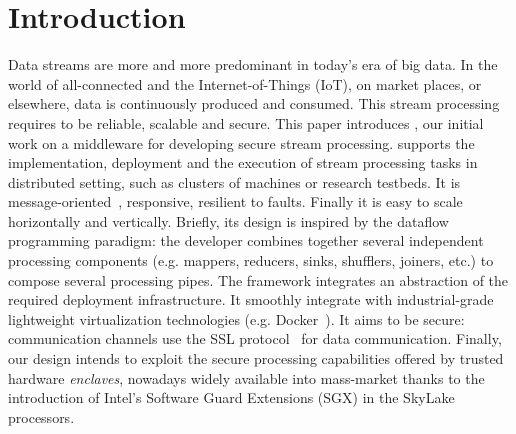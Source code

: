 \section{Introduction}
\label{sec:introduction}


Data streams are more and more predominant in today's era of big data.
In the world of all-connected and the Internet-of-Things (IoT), on market places, or elsewhere, data is continuously produced and consumed.
This stream processing requires to be reliable, scalable and secure.
This paper introduces \SYS, our initial work on a middleware for developing secure stream processing.
\SYS supports the implementation, deployment and the execution of stream processing tasks in distributed setting, such as clusters of machines or research testbeds.
It is message-oriented~\cite{mom}, responsive, resilient to faults.
Finally it is easy to scale horizontally and vertically.
Briefly, its design is inspired by the dataflow programming paradigm\cite{uustalu_essence_2005}: the developer combines together several independent processing components (e.g. mappers, reducers, sinks, shufflers, joiners, etc.) to compose several processing pipes.%
The framework integrates an abstraction of the required deployment infrastructure.
It smoothly integrate with industrial-grade lightweight virtualization technologies (e.g. Docker~\cite{docker}).
It aims to be secure: communication channels use the SSL protocol~\cite{freier2011secure} for data communication.
Finally, our design intends to exploit the secure processing capabilities offered by trusted hardware \emph{enclaves}, nowadays widely available into mass-market thanks to the introduction of Intel's Software Guard Extensions (SGX)\cite{costan_intel} in the SkyLake processors\cite{skylake}.


